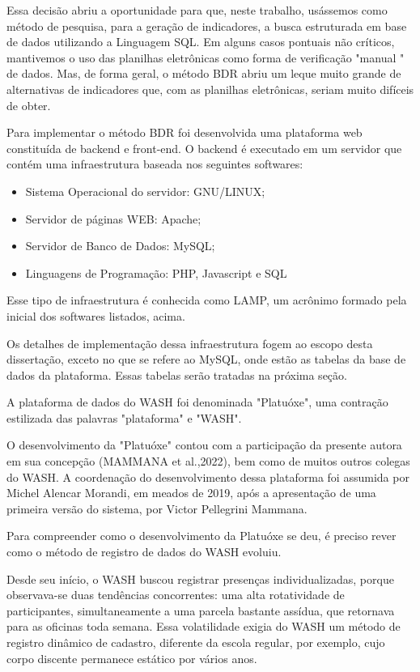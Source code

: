 Essa decisão abriu a oportunidade para que, neste trabalho, usássemos como método de pesquisa, para a geração de indicadores, a busca estruturada em base de dados utilizando a Linguagem SQL. Em alguns casos pontuais não críticos, mantivemos o uso das planilhas eletrônicas como forma de verificação "manual " de dados. Mas, de forma geral, o método BDR abriu um leque muito grande de alternativas de indicadores que, com as planilhas eletrônicas, seriam muito difíceis de obter.

Para implementar o método BDR foi desenvolvida uma plataforma web constituída de backend e front-end. O backend é executado em um servidor que contém uma infraestrutura baseada nos seguintes softwares:


\begin{itemize}
\item Sistema Operacional do servidor: GNU/LINUX;
\item Servidor de páginas WEB: Apache;
\item Servidor de Banco de Dados: MySQL;
\item Linguagens de Programação: PHP, Javascript e SQL
\end{itemize}

Esse tipo de infraestrutura é conhecida como LAMP, um acrônimo formado pela inicial dos softwares listados, acima.

Os detalhes de implementação dessa infraestrutura fogem ao escopo desta dissertação, exceto no que se refere ao MySQL, onde estão as tabelas da base de dados da plataforma. Essas tabelas serão tratadas na próxima seção.

A plataforma de dados do WASH foi denominada "Platuóxe", uma contração estilizada das palavras "plataforma" e "WASH".

O desenvolvimento da "Platuóxe" contou com a participação da presente autora em sua concepção  (MAMMANA et al.,2022), bem como de muitos outros colegas do WASH. A coordenação do desenvolvimento dessa plataforma foi assumida por Michel Alencar Morandi, em meados de 2019, após a apresentação de uma primeira versão do sistema, por Victor Pellegrini Mammana.

Para compreender como o desenvolvimento da Platuóxe se deu, é preciso rever como o método de registro de dados do WASH evoluiu.

Desde seu início, o WASH buscou registrar presenças individualizadas, porque observava-se duas tendências concorrentes: uma alta rotatividade de participantes, simultaneamente a uma parcela bastante assídua, que retornava para as oficinas toda semana. Essa volatilidade exigia do WASH um método de registro dinâmico de cadastro, diferente da escola regular, por exemplo, cujo corpo discente  permanece estático por vários anos.

